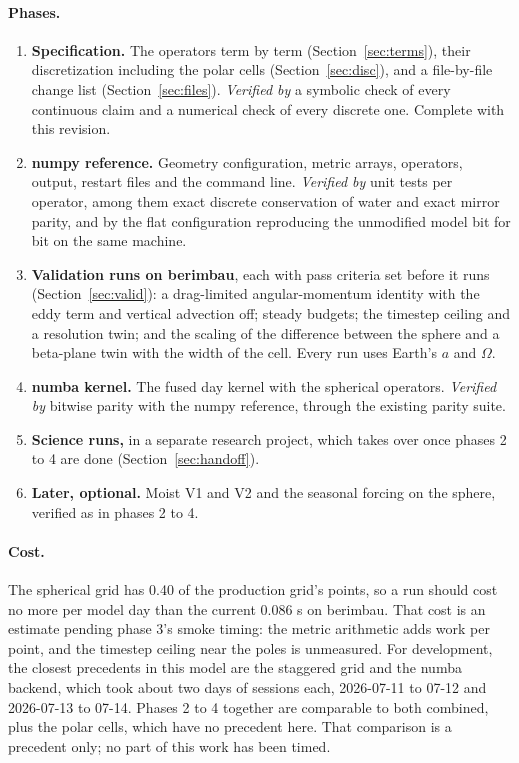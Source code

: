 \documentclass[11pt]{article}
\begin{document}
\paragraph{Phases.}
\begin{enumerate}
\item \textbf{Specification.} The operators term by term (Section~\ref{sec:terms}),
  their discretization including the polar cells (Section~\ref{sec:disc}), and
  a file-by-file change list (Section~\ref{sec:files}). \emph{Verified by} a
  symbolic check of every continuous claim and a numerical check of every
  discrete one. Complete with this revision.
\item \textbf{numpy reference.} Geometry configuration, metric arrays,
  operators, output, restart files and the command line. \emph{Verified by}
  unit tests per operator, among them exact discrete conservation of water and
  exact mirror parity, and by the flat configuration reproducing the
  unmodified model bit for bit on the same machine.
\item \textbf{Validation runs on berimbau}, each with pass criteria set before
  it runs (Section~\ref{sec:valid}): a drag-limited angular-momentum identity
  with the eddy term and vertical advection off; steady budgets; the timestep
  ceiling and a resolution twin; and the scaling of the difference between the
  sphere and a beta-plane twin with the width of the cell. Every run uses
  Earth's $a$ and $\Omega$.
\item \textbf{numba kernel.} The fused day kernel with the spherical operators.
  \emph{Verified by} bitwise parity with the numpy reference, through the
  existing parity suite.
\item \textbf{Science runs,} in a separate research project, which takes over
  once phases 2 to 4 are done (Section~\ref{sec:handoff}).
\item \textbf{Later, optional.} Moist V1 and V2 and the seasonal forcing on the
  sphere, verified as in phases 2 to 4.
\end{enumerate}

\paragraph{Cost.} The spherical grid has 0.40 of the production grid's points,
so a run should cost no more per model day than the current 0.086 s on
berimbau. That cost is an estimate pending phase 3's smoke timing: the metric
arithmetic adds work per point, and the timestep ceiling near the poles is
unmeasured. For development, the closest precedents in this model are the
staggered grid and the numba backend, which took about two days of sessions
each, 2026-07-11 to 07-12 and 2026-07-13 to 07-14. Phases 2 to 4 together are
comparable to both combined, plus the polar cells, which have no precedent
here. That comparison is a precedent only; no part of this work has been
timed.
\end{document}
